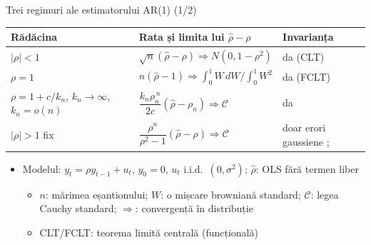 \begin{frame}{Trei regimuri ale estimatorului AR(1) (1/2)}
\itemsize{\small}
{\renewcommand{\arraystretch}{2.0}\begin{center}
\footnotesize
\begin{tabular}{@{}lll@{}}
\toprule
\textbf{Rădăcina} & \textbf{Rata și limita lui} $\hat\rho - \rho$ & \textbf{Invarianța} \\
\midrule
$|\rho| < 1$ & $\sqrt n(\hat\rho - \rho) \Rightarrow N(0, 1 - \rho^2)$ & da (CLT) \\
$\rho = 1$ & $n(\hat\rho - 1) \Rightarrow \int_0^1 W\,dW \big/ \int_0^1 W^2$ & da (FCLT) \\
$\rho = 1 + c/k_n$, $k_n \to \infty$, $k_n = o(n)$ & $\dfrac{k_n\rho_n^{\,n}}{2c}(\hat\rho - \rho_n) \Rightarrow \mathcal C$ & da {} \\
$|\rho| > 1$ fix & $\dfrac{\rho^n}{\rho^2 - 1}(\hat\rho - \rho) \Rightarrow \mathcal C$ & doar erori gaussiene ; {} \\
\bottomrule
\end{tabular}
\end{center}
}\begin{itemize}
    \item Modelul: $y_t = \rho y_{t-1} + u_t$, $y_0 = 0$, $u_t$ i.i.d.\ $(0, \sigma^2)$; $\hat\rho$: OLS fără termen liber
    \begin{itemize}
        \item $n$: mărimea eșantionului; $W$: o mișcare browniană standard; $\mathcal C$: legea Cauchy standard; $\Rightarrow$: convergență în distribuție
        \item CLT/FCLT: teorema limită centrală (funcțională)
    \end{itemize}
\end{itemize}
\end{frame}

